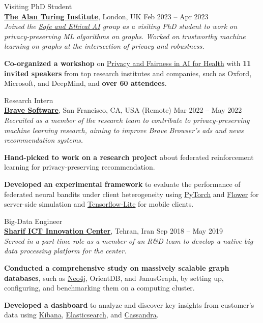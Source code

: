 \documentclass[10pt]{article}
\begin{document}
\begin{outerlist}
	\item {Visiting PhD Student}\\ 
	\textbf{\href{https://www.turing.ac.uk/}{The Alan Turing Institute}}, London, UK \hfill {Feb 2023 -- Apr 2023}\\
  \textit{Joined the \href{https://www.turing.ac.uk/research/research-programmes/artificial-intelligence-ai/safe-and-ethical}{Safe and Ethical AI} group as a visiting PhD student to work on privacy-preserving ML algorithms on graphs. Worked on trustworthy machine learning on graphs at the intersection of privacy and robustness.}
	\begin{innerlist}
		\item \textbf{Co-organized a workshop} on \href{https://private-fair-ai.github.io/}{Privacy and Fairness in AI for Health} with \textbf{11 invited speakers} from top research institutes and companies, such as {Oxford}, {Microsoft}, and {DeepMind}, and \textbf{over 60 attendees}.
	\end{innerlist}

	\item {Research Intern}\\
	\textbf{\href{https://brave.com/}{Brave Software}}, San Francisco, CA, USA (Remote) \hfill {Mar 2022 -- May 2022}\\
  \textit{Recruited as a member of the research team to contribute to privacy-preserving machine learning research, aiming to improve Brave Browser's ads and news recommendation systems.}
	\begin{innerlist}
		\item \textbf{Hand-picked to work on a research project} about federated reinforcement learning for privacy-preserving recommendation.
		\item \textbf{Developed an experimental framework} to evaluate the performance of federated neural bandits under client heterogeneity using \href{https://pytorch.org/}{PyTorch} and \href{https://flower.dev/}{Flower} for server-side simulation and \href{https://www.tensorflow.org/lite}{Tensorflow-Lite} for mobile clients.
	\end{innerlist}


	\item {Big-Data Engineer} \\
	\href{http://ictic.sharif.ir}{\textbf{Sharif ICT Innovation Center}}, Tehran, Iran \hfill {Sep 2018 -- May 2019}\\
  \textit{Served in a part-time role as a member of an R\&D team to develop a native big-data processing platform for the center.}
	\begin{innerlist}
		\item \textbf{Conducted a comprehensive study on massively scalable graph databases}, such as \href{https://neo4j.com/}{Neo4j}, OrientDB, and JanusGraph, by setting up, configuring, and benchmarking them on a computing cluster.
		\item \textbf{Developed a dashboard} to analyze and discover key insights from customer's data using \href{https://www.elastic.co/kibana}{Kibana}, \href{https://www.elastic.co/elasticsearch/}{Elasticsearch}, and \href{https://cassandra.apache.org/}{Cassandra}.
	\end{innerlist}



\end{outerlist}
\end{document}
